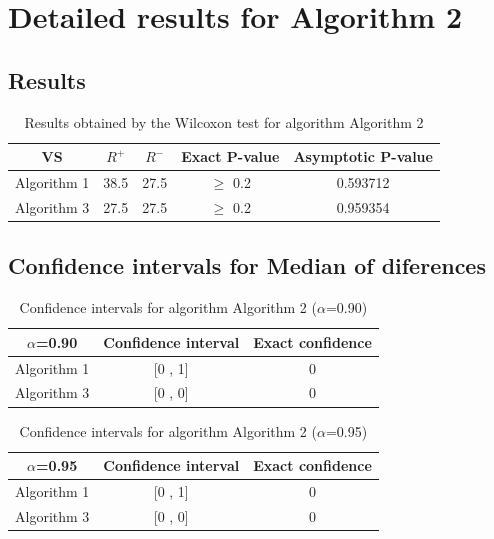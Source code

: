 \documentclass[a4paper,10pt]{article}
\begin{document}
 \clearpage 


\section{Detailed results for Algorithm 2}


\subsection{Results}

\begin{table}[!htp]
\centering\small
\begin{tabular}{
|c|c|c|c|c|}
\hline
 VS & $R^{+}$ & $R^{-}$ & Exact P-value & Asymptotic P-value \\ \hline 
Algorithm 1 & 38.5 & 27.5 & $\geq$ 0.2 & 0.593712\\ \hline 
Algorithm 3 & 27.5 & 27.5 & $\geq$ 0.2 & 0.959354\\ \hline 

\end{tabular}
\caption{Results obtained by the Wilcoxon test for algorithm Algorithm 2}
\end{table}

\subsection{Confidence intervals for Median of diferences}

\begin{table}[!htp]
\centering\small
\begin{tabular}{
|c|c|c|}
\hline
 $\alpha$=0.90 & Confidence interval & Exact confidence \\ \hline 
Algorithm 1 & [0 , 1] & 0\\ \hline 
Algorithm 3 & [0 , 0] & 0\\ \hline 

\end{tabular}
\caption{Confidence intervals for algorithm Algorithm 2 ($\alpha$=0.90)}
\end{table}
\begin{table}[!htp]
\centering\small
\begin{tabular}{
|c|c|c|}
\hline
 $\alpha$=0.95 & Confidence interval & Exact confidence \\ \hline 
Algorithm 1 & [0 , 1] & 0\\ \hline 
Algorithm 3 & [0 , 0] & 0\\ \hline 

\end{tabular}
\caption{Confidence intervals for algorithm Algorithm 2 ($\alpha$=0.95)}
\end{table}
\end{document}
